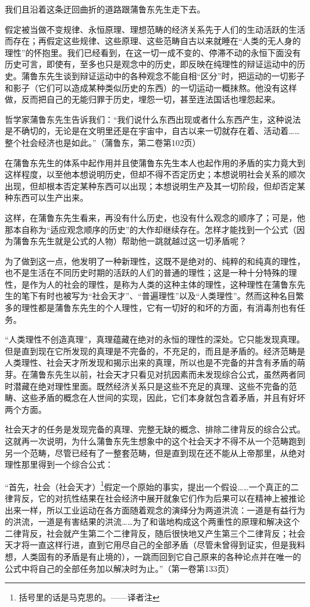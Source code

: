\documentclass[a4paper,twoside,12pt,AutoFakeBold]{ctexart}
\begin{document}
我们且沿着这条迂回曲折的道路跟蒲鲁东先生走下去。

假定被当做不变规律、永恒原理、理想范畴的经济关系先于人们的生动活跃的生活而存在；再假定这些规律、这些原理、这些范畴自古以来就睡在“人类的无人身的理性”的怀抱里。我们已经看到，在这一切一成不变的、停滞不动的永恒下面没有历史可言，即使有，至多也只是观念中的历史，即反映在纯理性的辩证运动中的历史。蒲鲁东先生谈到辩证运动中的各种观念不能自相“区分”时，把运动的一切影子和影子（它们可以造成某种类似历史的东西）的一切运动一概抹熬。他没有这样做，反而把自己的无能归罪于历史，埋怨一切，甚至连法国话也埋怨起来。

哲学家蒲鲁东先生告诉我们：“我们说什么东西出现或者什么东西产生，这种说法是不确切的，无论是在文明里还是在宇宙中，自古以来一切就存在着、活动着……整个社会经济也是如此。”（蒲鲁东，第二卷第102页）

在蒲鲁东先生的体系中起作用并且使蒲鲁东先生本人也起作用的矛盾的实力竟大到这样程度，以至他本想说明历史，但却不得不否定历史；本想说明社会关系的顺次出现，但却根本否定某种东西可以出现；本想说明生产及其一切阶段，但却否定某种东西可以生产出来。

这样，在蒲鲁东先生看来，再没有什么历史，也没有什么观念的顺序了；可是，他那本自称为“适应观念顺序的历史”的大作却继续存在。怎样才能找到一个公式（因为蒲鲁东先生就是公式的人物）帮助他一跳就越过这一切矛盾呢？

为了做到这一点，他发明了一种新理性，这既不是绝对的、纯粹的和纯真的理性，也不是生活在不同历史时期的活跃的人们的普通的理性；这是一种十分特殊的理性，是作为人的社会的理性，是称为人类的这种主体的理性，这种理性在蒲鲁东先生的笔下有时也被写为“社会天才”、“普遍理性”以及“人类理性”。然而这种名目繁多的理性都是蒲鲁东先生的个人理性，它有一切好的和坏的方面，有消毒剂也有任务。

“人类理性不创造真理”，真理蕴藏在绝对的永恒的理性的深处。它只能发现真理。但是直到现在它所发现的真理是不完备的，不充足的，而且是矛盾的。经济范畴是人类理性、社会天才所发现和揭示出来的真理，所以也是不完备的并含有矛盾的萌芽。在蒲鲁东先生以前，社会天才只看见对抗因素而未发现综合公式，虽然两者同时潜藏在绝对理性里面。既然经济关系只是这些不充足的真理、这些不完备的范畴、这些矛盾的概念在人世间的实现，因此，它们本身就包含着矛盾，并且有好坏两个方面。

社会天才的任务是发现完备的真理、完整无缺的概念、排除二律背反的综合公式。这就再一次说明，为什么蒲鲁东先生想象中的这个社会天才不得不从一个范畴跑到另一个范畴，尽管已经有了一整套范畴，但是直到现在还不能从上帝那里，从绝对理性那里得到一个综合公式：

\begin{fangsong}
    “首先，社会（社会天才）\footnote{括号里的话是马克思的。——译者注}假定一个原始的事实，提出一个假设……一个真正的二律背反，它的对抗性结果在社会经济中展开就象它们作为后果可以在精神上被推论出来一样，所以工业运动在各方面随着观念的演绎分为两道洪流：一道是有益行为的洪流，一道是有害结果的洪流……为了和谐地构成这个两重性的原理和解决这个二律背反，社会就产生第二个二律背反，随后很快地又产生第三个二律背反；社会天才将一直这样行进，直到它用尽自己的全部矛盾（尽管未曾得到证实，但是我料想，人类固有的矛盾是有止境的），一跳而回到它自己原来的各种论点并在唯一的公式中将自己的全部任务加以解决时为止。”（第一卷第133页）
\end{fangsong}
\end{document}
